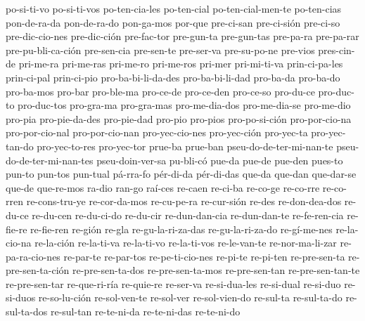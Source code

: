 {po-si-ti-vo po-si-ti-vos po-ten-cia-les po-ten-cial po-ten-cial-men-te po-ten-cias pon-de-ra-da pon-de-ra-do
pon-ga-mos por-que pre-ci-san pre-ci-sión pre-ci-so pre-dic-cio-nes pre-dic-ción pre-fac-tor pre-gun-ta
pre-gun-tas pre-pa-ra pre-pa-rar pre-pu-bli-ca-ción pre-sen-cia pre-sen-te pre-ser-va pre-su-po-ne pre-vios
pres-cin-de pri-me-ra pri-me-ras pri-me-ro pri-me-ros pri-mer pri-mi-ti-va prin-ci-pa-les prin-ci-pal
prin-ci-pio pro-ba-bi-li-da-des pro-ba-bi-li-dad pro-ba-da pro-ba-do pro-ba-mos pro-bar pro-ble-ma pro-ce-de
pro-ce-den pro-ce-so pro-du-ce pro-duc-to pro-duc-tos pro-gra-ma pro-gra-mas pro-me-dia-dos pro-me-dia-se
pro-me-dio pro-pia pro-pie-da-des pro-pie-dad pro-pio pro-pios pro-po-si-ción pro-por-cio-na pro-por-cio-nal
pro-por-cio-nan pro-yec-cio-nes pro-yec-ción pro-yec-ta pro-yec-tan-do pro-yec-to-res pro-yec-tor prue-ba
prue-ban pseu-do-de-ter-mi-nan-te pseu-do-de-ter-mi-nan-tes pseu-doin-ver-sa pu-bli-có pue-da pue-de pue-den
pues-to pun-to pun-tos pun-tual pá-rra-fo pér-di-da pér-di-das que-da que-dan que-dar-se que-de que-re-mos
ra-dio ran-go raí-ces re-caen re-ci-ba re-co-ge re-co-rre re-co-rren re-cons-tru-ye re-cor-da-mos
re-cu-pe-ra re-cur-sión re-des re-don-dea-dos re-du-ce re-du-cen re-du-ci-do re-du-cir re-dun-dan-cia
re-dun-dan-te re-fe-ren-cia re-fie-re re-fie-ren re-gión re-gla re-gu-la-ri-za-das re-gu-la-ri-za-do
re-gí-me-nes re-la-cio-na re-la-ción re-la-ti-va re-la-ti-vo re-la-ti-vos re-le-van-te re-nor-ma-li-zar
re-pa-ra-cio-nes re-par-te re-par-tos re-pe-ti-cio-nes re-pi-te re-pi-ten re-pre-sen-ta re-pre-sen-ta-ción
re-pre-sen-ta-dos re-pre-sen-ta-mos re-pre-sen-tan re-pre-sen-tan-te re-pre-sen-tar re-que-ri-ría re-quie-re
re-ser-va re-si-dua-les re-si-dual re-si-duo re-si-duos re-so-lu-ción re-sol-ven-te re-sol-ver
re-sol-vien-do re-sul-ta re-sul-ta-do re-sul-ta-dos re-sul-tan re-te-ni-da re-te-ni-das re-te-ni-do
}


